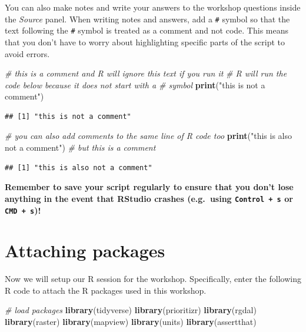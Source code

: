 \documentclass[12pt,]{book}
\newenvironment{Shaded}{\begin{snugshade}}{\end{snugshade}}
\newcommand{\KeywordTok}[1]{\textcolor[rgb]{0.13,0.29,0.53}{\textbf{#1}}}
\newcommand{\StringTok}[1]{\textcolor[rgb]{0.31,0.60,0.02}{#1}}
\newcommand{\CommentTok}[1]{\textcolor[rgb]{0.56,0.35,0.01}{\textit{#1}}}
\newcommand{\NormalTok}[1]{#1}
\begin{document}
You can also make notes and write your answers to the workshop questions
inside the \emph{Source} panel. When writing notes and answers, add a
\texttt{\#} symbol so that the text following the \texttt{\#} symbol is
treated as a comment and not code. This means that you don't have to
worry about highlighting specific parts of the script to avoid errors.

\begin{Shaded}
\begin{Highlighting}[]
\CommentTok{# this is a comment and R will ignore this text if you run it}
\CommentTok{# R will run the code below because it does not start with a # symbol}
\KeywordTok{print}\NormalTok{(}\StringTok{"this is not a comment"}\NormalTok{)}
\end{Highlighting}
\end{Shaded}

\begin{verbatim}
## [1] "this is not a comment"
\end{verbatim}

\begin{Shaded}
\begin{Highlighting}[]
\CommentTok{# you can also add comments to the same line of R code too}
\KeywordTok{print}\NormalTok{(}\StringTok{"this is also not a comment"}\NormalTok{) }\CommentTok{# but this is a comment}
\end{Highlighting}
\end{Shaded}

\begin{verbatim}
## [1] "this is also not a comment"
\end{verbatim}

\textbf{Remember to save your script regularly to ensure that you don't
lose anything in the event that RStudio crashes (e.g.~using
\texttt{Control\ +\ s} or \texttt{CMD\ +\ s})!}

\section{Attaching packages}\label{attaching-packages}

Now we will setup our R session for the workshop. Specifically, enter
the following R code to attach the R packages used in this workshop.

\begin{Shaded}
\begin{Highlighting}[]
\CommentTok{# load packages}
\KeywordTok{library}\NormalTok{(tidyverse)}
\KeywordTok{library}\NormalTok{(prioritizr)}
\KeywordTok{library}\NormalTok{(rgdal)}
\KeywordTok{library}\NormalTok{(raster)}
\KeywordTok{library}\NormalTok{(mapview)}
\KeywordTok{library}\NormalTok{(units)}
\KeywordTok{library}\NormalTok{(assertthat)}
\end{Highlighting}
\end{Shaded}
\end{document}
